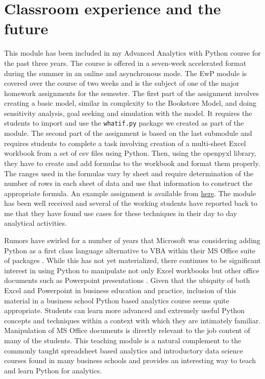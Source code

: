 \documentclass[ited,blindrev]{informs3}              %
\newcommand{\code}[1]{\texttt{#1}}
\begin{document}
\section{Classroom experience and the future}

This module has been included in my Advanced Analytics with Python course for the past three years. The course is offered in a seven-week accelerated format during the summer in an online and asynchronous mode. The EwP module is covered over the course of two weeks and is the subject of one of the major homework assignments for the semester. The first part of the assignment involves creating a basic model, similar in complexity to the Bookstore Model, and doing sensitivity analysis, goal seeking and simulation with the model. It requires the students to import and use the \code{whatif.py} package we created as part of the module. The second part of the assignment is based on the last submodule and requires  students to complete a task involving creation of a multi-sheet Excel workbook from a set of csv files using Python. Then, using the openpyxl library, they have to create and add formulas to the workbook and format them properly. The ranges used in the formulas vary by sheet and require determination of the number of rows in each sheet of data and use that information to construct the appropriate formula. An example assignment is available from \href{https://drive.google.com/file/d/1prf8acZXZ4RoYBgQ8e9-eijA65uV7T-V/view?usp=sharing}{here}. The module has been well received and several of the working students have reported back to me that they have found use cases for these techniques in their day to day analytical activities.

Rumors have swirled for a number of years that Microsoft was considering adding Python as a first class language alternative to VBA within their MS Office suite of packages \cite{cimpanuMicrosoftConsidersAdding2017}. While this has not yet materialized, there continues to be significant interest in using Python to manipulate not only Excel workbooks but other office documents such as Powerpoint presentations \cite{cannyPythonpptx2013}. Given that the ubiquity of both Excel and Powerpoint in business education and practice, inclusion of this material in a business school Python based analytics course seems quite appropriate. Students can learn more advanced and extremely useful Python concepts and techniques within a context with which they are intimately familiar. Manipulation of MS Office documents is directly relevant to the job content of many of the students. This teaching module is a natural complement to the commonly taught spreadsheet based analytics and introductory data science courses found in many business schools and provides an interesting way to teach and learn Python for analytics.
\end{document}
